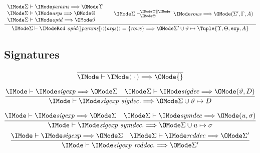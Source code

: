 \begin{gather}
  \infer{
    \Elab{\Sigma}{\ProdRcdDecl{\SortOpId}{\SortParams}{\SortArgs}{\SortRcdRows}}{
      \Sigma'\cup \vartheta\mapsto \Tuple{\Upsilon, \Theta, \AbtSortExp, A}
    }
  }{
    \begin{array}{l}
      \Elab{\Sigma}{\SortParams}{\Upsilon}\\
      \Elab{\Sigma}{\SortArgs}{\Theta}\\
      \Elab{\Sigma}{\SortOpId}{\vartheta}
    \end{array} &
    \begin{array}{l}
      \ElabWthCtx{\Theta}{\Upsilon}{\cdot}{\Sigma}{\SortRcdRows}{(\Sigma', \Gamma, A)}
    \end{array}
  }
\end{gather}


\subsection*{Signatures\hfill \framebox{$\Elab{}{\SortSigExpr}{\Sigma}$}}

\begin{gather}
  \infer{
    \Elab{}{\ProdEmptySig}{\{\}}
  }{
  }\\[6pt]
  \infer{
    \Elab{}{\ProdExtendSig{\SortSigExpr}{\SortSigDecl}}{\Sigma\cup\vartheta\mapsto D}
  }{
    \Elab{}{\SortSigExpr}{\Sigma} &
    \Elab{\Sigma}{\SortSigDecl}{(\vartheta, D)}
  }\\[6pt]
  \infer{
    \Elab{}{\ProdExtendSig{\SortSigExpr}{\SortSymDecl}}{\Sigma\cup u\mapsto \sigma}
  }{
    \Elab{}{\SortSigExpr}{\Sigma} &
    \Elab{\Sigma}{\SortSymDecl}{(u, \sigma)}
  }\\
  \infer{
    \Elab{}{\ProdExtendSig{\SortSigExpr}{\SortRcdDecl}}{\Sigma'}
  }{
    \Elab{}{\SortSigExpr}{\Sigma} &
    \Elab{\Sigma}{\SortRcdDecl}{\Sigma'}
  }
\end{gather}

